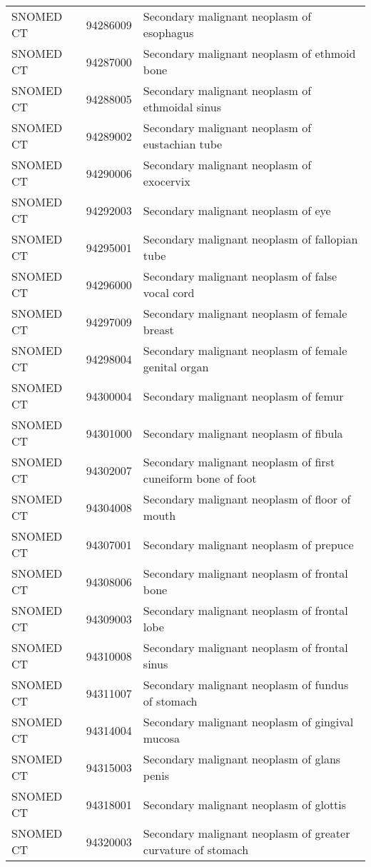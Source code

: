 \begin{longtable}{p{}p{}p{}}
  SNOMED CT & 94286009 & Secondary malignant neoplasm of esophagus \\ 
  SNOMED CT & 94287000 & Secondary malignant neoplasm of ethmoid bone \\ 
  SNOMED CT & 94288005 & Secondary malignant neoplasm of ethmoidal sinus \\ 
  SNOMED CT & 94289002 & Secondary malignant neoplasm of eustachian tube \\ 
  SNOMED CT & 94290006 & Secondary malignant neoplasm of exocervix \\ 
  SNOMED CT & 94292003 & Secondary malignant neoplasm of eye \\ 
  SNOMED CT & 94295001 & Secondary malignant neoplasm of fallopian tube \\ 
  SNOMED CT & 94296000 & Secondary malignant neoplasm of false vocal cord \\ 
  SNOMED CT & 94297009 & Secondary malignant neoplasm of female breast \\ 
  SNOMED CT & 94298004 & Secondary malignant neoplasm of female genital organ \\ 
  SNOMED CT & 94300004 & Secondary malignant neoplasm of femur \\ 
  SNOMED CT & 94301000 & Secondary malignant neoplasm of fibula \\ 
  SNOMED CT & 94302007 & Secondary malignant neoplasm of first cuneiform bone of foot \\ 
  SNOMED CT & 94304008 & Secondary malignant neoplasm of floor of mouth \\ 
  SNOMED CT & 94307001 & Secondary malignant neoplasm of prepuce \\ 
  SNOMED CT & 94308006 & Secondary malignant neoplasm of frontal bone \\ 
  SNOMED CT & 94309003 & Secondary malignant neoplasm of frontal lobe \\ 
  SNOMED CT & 94310008 & Secondary malignant neoplasm of frontal sinus \\ 
  SNOMED CT & 94311007 & Secondary malignant neoplasm of fundus of stomach \\ 
  SNOMED CT & 94314004 & Secondary malignant neoplasm of gingival mucosa \\ 
  SNOMED CT & 94315003 & Secondary malignant neoplasm of glans penis \\ 
  SNOMED CT & 94318001 & Secondary malignant neoplasm of glottis \\ 
  SNOMED CT & 94320003 & Secondary malignant neoplasm of greater curvature of stomach \\ 

\end{longtable}
